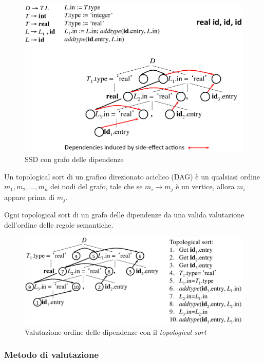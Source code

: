 \begin{figure}[H]
  \centering
  \includegraphics[scale=0.45]{res/image/ex_dependencies}
  \caption{SSD con grafo delle dipendenze}
  \label{img:ex_dependencies}
\end{figure}

\begin{definition}
Un topological sort di un grafico direzionato aciclico (DAG) \`e un qualsiasi
ordine $m_1,m_2,...,m_n$ dei nodi del grafo, tale che se $m_i \to m_j$ \`e un
vertice, allora $m_i$ appare prima di $m_j$.
\end{definition}

Ogni topological sort di un grafo delle dipendenze da una valida valutazione
dell'ordine delle regole semantiche.

\begin{figure}[H]
  \centering
  \includegraphics[scale=0.45]{res/image/topological_sort}
  \caption{Valutazione ordine delle dipendenze con il \textit{topological sort}}
  \label{img:topological_sort}
\end{figure}

\subsubsection{Metodo di valutazione}
